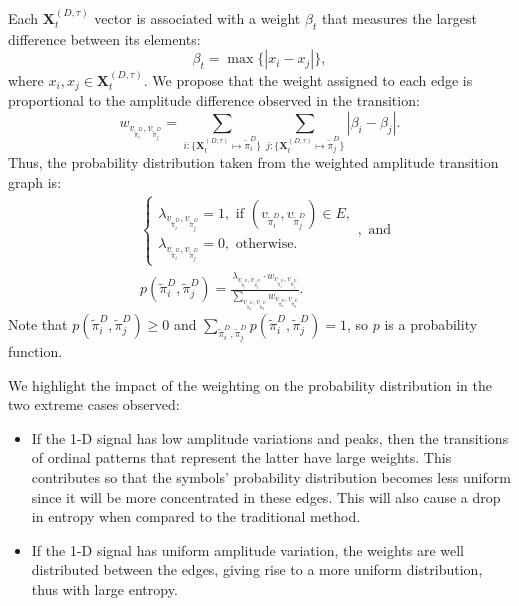 \documentclass[a4,11pt]{pssbmac}
\begin{document}
Each $\mathbf{X}^{(D, \tau)}_t$ vector is associated with a weight $\beta_t$ that measures the largest difference between its elements:
\begin{equation}
	\beta_t = \max\{|x_i - x_j|\},
\end{equation}
where $x_i, x_j \in \mathbf{X}^{(D, \tau)}_t$.
We propose that the weight assigned to each edge is proportional to the amplitude difference observed in the transition:	
\begin{equation}
	w_{v_{\widetilde \pi^D_i}, v_{\widetilde \pi^D_j}} =  \sum_{i : \{\mathbf{X}^{(D,\tau)}_t \mapsto \widetilde\pi^D_i\}} \sum_{j : \{\mathbf{X}^{(D,\tau)}_t \mapsto \widetilde\pi^D_j\}} |\beta_i - \beta_j| .
\end{equation}
Thus, the probability distribution taken from the weighted amplitude transition graph is:	
\begin{align}
	&\left\{\begin{array}{l}
		\lambda_{v_{\widetilde\pi^D_i}, v_{\widetilde\pi^D_j}} = 1, \text{ if } (v_{\widetilde\pi^D_i}, v_{\widetilde\pi^D_j}) \in {E}, \\
		\lambda_{v_{\widetilde\pi^D_i}, v_{\widetilde\pi^D_j}} = 0, \text{ otherwise}.
	\end{array}\right., \text{ and} \\
	&p(\widetilde\pi^D_i, \widetilde\pi^D_j) = \frac{\lambda_{v_{\widetilde\pi^D_i}, v_{\widetilde\pi^D_j}} \cdot w_{v_{\widetilde\pi^D_i}, v_{\widetilde\pi^D_j}}}{\sum_{v_{\widetilde\pi^D_a}, v_{\widetilde\pi^D_b}} w_{v_{\widetilde\pi^D_a}, v_{\widetilde\pi^D_b}}}.
\end{align}
Note that  $p(\widetilde\pi^D_i, \widetilde\pi^D_j) \ge 0$ and $\sum_{\widetilde\pi^D_i, \widetilde\pi^D_j} p(\widetilde\pi^D_i, \widetilde\pi^D_j) = 1$, so $p$ is a probability function.

We highlight the impact of the weighting on the probability distribution in the two extreme cases observed:
\begin{itemize}
	\item If the \mbox{1-D} signal has low amplitude variations and peaks, then the transitions of ordinal patterns that represent the latter have large weights.
	This contributes so that the symbols' probability distribution becomes less uniform since it will be more concentrated in these edges.
	This will also cause a drop in entropy when compared to the traditional method.
	\item If the \mbox{1-D} signal has uniform amplitude variation, the weights are well distributed between the edges, giving rise to a more uniform distribution, thus with large entropy.
\end{itemize}
\end{document}
